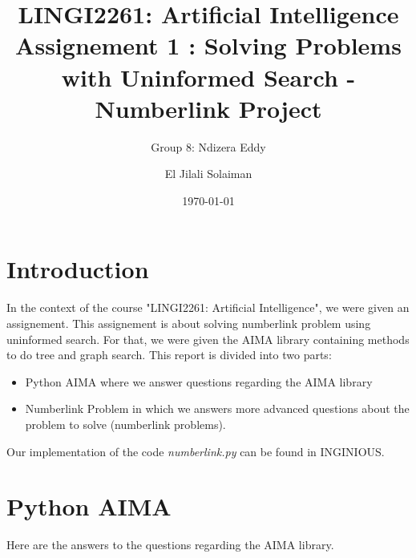 \documentclass[10pt,a4paper]{article}
\begin{document}
\title{LINGI2261: Artificial Intelligence \\
Assignement 1 : Solving Problems with Uninformed Search - Numberlink Project}
\author{Group 8: Ndizera Eddy \and El Jilali Solaiman}
\date{\today}
\maketitle

\section*{Introduction}

In the context of the course "LINGI2261: Artificial Intelligence", we were given an assignement. This assignement is about solving numberlink problem using uninformed search. For that, we were given the AIMA library containing methods to do tree and graph search. This report is divided into two parts:
\begin{itemize}
	\item Python AIMA where we answer questions regarding the AIMA library
	\item Numberlink Problem in which we answers more advanced questions about the problem to solve (numberlink problems).
\end{itemize}

Our implementation of the code \textit{numberlink.py} can be found in INGINIOUS.

\section{Python AIMA}

Here are the answers to the questions regarding the AIMA library.
\end{document}

